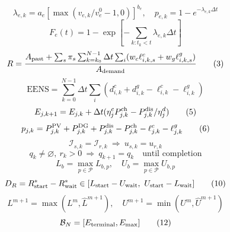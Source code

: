 \documentclass{article}
\begin{document}
\begin{equation}
\lambda_{e,k}=a_e[\max(v_{e,k}/v_e^0-1,0)]^{b_e},\quad p_{e,k}=1-e^{-\lambda_{e,k}\Delta t}
\tag{1}
\end{equation}
\begin{equation}
F_e(t)=1-\exp[-\sum_{k:t_k<t}\lambda_{e,k}\Delta t]
\tag{2}
\end{equation}
\begin{equation}
R={A_{\rm past}+\sum_s\pi_s\sum_{k=k_0}^{N-1}\Delta t\sum_i(w_c\ell^c_{i,k,s}+w_g\ell^g_{i,k,s})\over A_{\rm demand}}
\tag{3}
\end{equation}
\begin{equation}
\mathrm{EENS}=\sum_{k=0}^{N-1}\Delta t\sum_i(d^c_{i,k}+d^g_{i,k}-\ell^c_{i,k}-\ell^g_{i,k})
\tag{4}
\end{equation}
\begin{equation}
E_{j,k+1}=E_{j,k}+\Delta t(\eta^c_jP^{\rm ch}_{j,k}-P^{\rm dis}_{j,k}/\eta^d_j)
\tag{5}
\end{equation}
\begin{equation}
p_{j,k}=P^{\rm PV}_{j,k}+P^{\rm DG}_{j,k}+P^{\rm dis}_{j,k}-P^{\rm ch}_{j,k}-\ell^c_{j,k}-\ell^g_{j,k}
\tag{6}
\end{equation}
\begin{equation}
\mathcal I_{s,k}=\mathcal I_{r,k}\ \Longrightarrow\ u_{s,k}=u_{r,k}
\tag{7}
\end{equation}
\begin{equation}
q_k\ne\varnothing,\ r_k>0\ \Longrightarrow\ q_{k+1}=q_k\quad\text{until completion}
\tag{8}
\end{equation}
\begin{equation}
L_b=\max_{p\in\mathcal P}L_{b,p},\quad U_b=\max_{p\in\mathcal P}U_{b,p}
\tag{9}
\end{equation}
\begin{equation}
D_R=R^*_{\rm start}-R^*_{\rm wait}\in[L_{\rm start}-U_{\rm wait},\ U_{\rm start}-L_{\rm wait}]
\tag{10}
\end{equation}
\begin{equation}
L^{m+1}=\max(L^m,\widehat L^{m+1}),\quad U^{m+1}=\min(U^m,\widehat U^{m+1})
\tag{11}
\end{equation}
\begin{equation}
\mathcal B_N=[E_{\rm terminal},E_{\max}]
\tag{12}
\end{equation}
\end{document}
